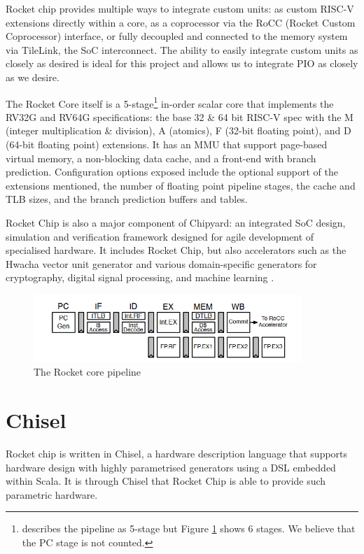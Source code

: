 Rocket chip provides multiple ways to integrate custom units: as custom RISC-V extensions directly within a core, as a coprocessor via the RoCC (Rocket Custom Coprocessor) interface, or fully decoupled and connected to the memory system via TileLink, the SoC interconnect. The ability to easily integrate custom units as closely as desired is ideal for this project and allows us to integrate PIO as closely as we desire.

The Rocket Core itself is a 5-stage\footnote{\cite{rocketchip} describes the pipeline as 5-stage but Figure \ref{fig:rocket-core} shows 6 stages. We believe that the PC stage is not counted.} in-order scalar core that implements the RV32G and RV64G specifications: the base 32 \& 64 bit RISC-V spec with the M (integer multiplication \& division), A (atomics), F (32-bit floating point), and D (64-bit floating point) extensions. It has an MMU that support page-based virtual memory, a non-blocking data cache, and a front-end with branch prediction. Configuration options exposed include the optional support of the extensions mentioned, the number of floating point pipeline stages, the cache and TLB sizes, and the branch prediction buffers and tables.

Rocket Chip is also a major component of Chipyard: an integrated SoC design, simulation and verification framework designed for agile development of specialised hardware. It includes Rocket Chip, but also accelerators such as the Hwacha vector unit generator and various domain-specific generators for cryptography, digital signal processing, and machine learning \cite{chipyard}.

\begin{figure}[h!]
    \centering
    \includegraphics[width=0.9\textwidth]{../img/rocket-core.png}
    \caption{The Rocket core pipeline \cite{rocketchip} }
    \label{fig:rocket-core}
\end{figure}

\section{Chisel}
Rocket chip is written in Chisel, a hardware description language that supports hardware design with highly parametrised generators using a DSL embedded within Scala. It is through Chisel that Rocket Chip is able to provide such parametric hardware.

